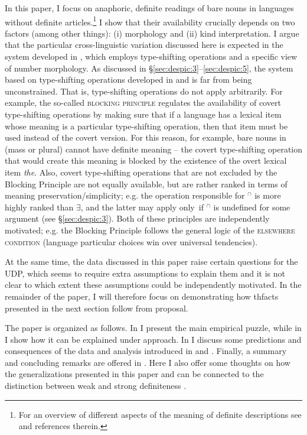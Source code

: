 \documentclass[output=paper,
modfonts
]{langscibook}
\begin{document}
	In this paper, I focus on anaphoric, definite readings of bare nouns in languages without definite articles.\footnote{For an overview of different aspects of the meaning of definite descriptions see \citet{Schwarz2009} and references
		therein.}  I show that their availability crucially depends on two factors (among other things): (i)  morphology and (ii) kind interpretation. I argue that the particular cross-linguistic variation discussed here is expected in the system developed in \citet{Dayal2004}, which employs type-shifting operations and a specific view of number morphology. 
	As discussed in \S\ref{sec:despic:3}--\ref{sec:despic:5}, the system based on type-shifting operations developed in \citet{Chierchia1998} and \citet{Dayal2004} is far from being unconstrained. That is, type-shifting operations do not apply arbitrarily. For example, the so-called \textsc{blocking principle} regulates the availability of covert type-shifting operations by making sure that if a language has a lexical item whose meaning is a particular type-shifting operation, then that item must be used instead of the covert version. For this reason, for example, bare nouns in  (mass or plural) cannot have definite meaning -- the covert type-shifting operation that would create this meaning is blocked by the existence of the overt lexical item \textit{the}. Also, covert type-shifting operations that are not excluded by the Blocking Principle are not equally available, but are rather ranked in terms of meaning preservation/simplicity; e.g. the operation responsible for  $^\cap$ is more highly ranked than $\exists$, and the latter may apply only~if $^\cap$ is undefined for some argument (see \S\ref{sec:despic:3}). Both of these principles are independently motivated; e.g. the Blocking Principle follows the general logic of the \textsc{elsewhere condition} (language particular choices win over universal tendencies).  
	
	At the same time, the data discussed in this paper raise certain questions for the UDP, which seems to require extra assumptions to explain them and it is not clear to which extent these assumptions could be independently motivated. In the remainder of the paper, I will therefore focus on demonstrating how th\largerpage facts presented in the next section follow from  proposal. 
	
	The paper is organized as follows. In  I present the main empirical puzzle, while in  I show how it can be explained under  approach. In  I discuss some predictions and consequences of the data and analysis introduced in  and . Finally, a summary and concluding remarks are offered in .
	Here I also offer some thoughts on how the generalizations presented in this paper and \citet{Dayal2004} can be connected to the distinction between weak and strong definiteness \citep[e.g.][]{Schwarz2009}. 
	
\end{document}
